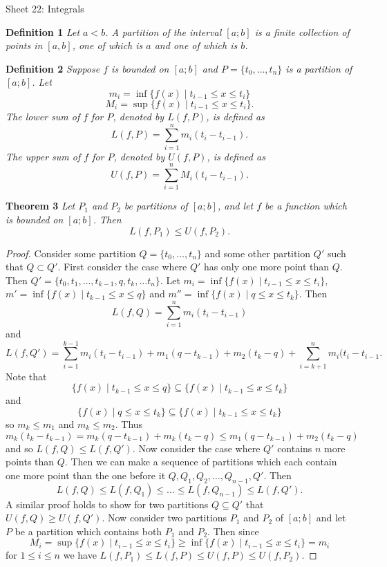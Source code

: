 \documentclass{article}
\begin{document}
\begin{flushleft}

\Large

Sheet 22: Integrals\newline

\normalsize

\textbf{Definition 1}
\textsl{Let $a<b$. A partition of the interval $[a;b]$ is a finite collection of points in $[a,b]$, one of which is $a$ and one of which is $b$.}\newline

\textbf{Definition 2}
\textsl{Suppose $f$ is bounded on $[a;b]$ and $P=\{t_0, \dots , t_n\}$ is a partition of $[a;b]$. Let
\[
m_i = \inf \{f(x) \mid t_{i-1} \leq x \leq t_i\}
\]
\[
M_i = \sup \{f(x) \mid t_{i-1} \leq x \leq t_i\}.
\]
The lower sum of $f$ for $P$, denoted by $L(f,P)$, is defined as
\[
L(f,P) = \sum_{i=1}^n m_i (t_i - t_{i-1}).
\]
The upper sum of $f$ for $P$, denoted by $U(f,P)$, is defined as
\[
U(f,P) = \sum_{i=1}^n M_i (t_i - t_{i-1}).
\]}\newline

\textbf{Theorem 3}
\textsl{Let $P_1$ and $P_2$ be partitions of $[a;b]$, and let $f$ be a function which is bounded on $[a;b]$. Then
\[
L(f,P_1) \leq U(f,P_2).
\]}
\begin{proof}
Consider some partition $Q = \{t_0, \dots , t_n\}$ and some other partition $Q'$ such that $Q \subset Q'$. First consider the case where $Q'$ has only one more point than $Q$. Then $Q' = \{t_0, t_1, \dots , t_{k-1}, q, t_k, \dots t_n\}$. Let $m_i = \inf \{f(x) \mid t_{i-1} \leq x \leq t_i\}$, $m' = \inf \{f(x) \mid t_{k-1} \leq x \leq q\}$ and $m'' = \inf \{f(x) \mid q \leq x \leq t_k\}$. Then
\[
L(f,Q) = \sum_{i=1}^n m_i (t_i - t_{i-1})
\]
and
\[
L(f,Q') = \sum_{i=1}^{k-1} m_i (t_i-t_{i-1}) + m_1 (q-t_{k-1}) + m_2 (t_k-q) + \sum_{i=k+1}^n m_i (t_i-t_{i-1}.
\]
Note that
\[
\{f(x) \mid t_{k-1} \leq x \leq q\} \subseteq \{f(x) \mid t_{k-1} \leq x \leq t_k\}
\]
and
\[
\{f(x) \mid q \leq x \leq t_k\} \subseteq \{f(x) \mid t_{k-1} \leq x \leq t_k\}
\]
so $m_k \leq m_1$ and $m_k \leq m_2$. Thus
\[
m_k (t_k - t_{k-1}) = m_k (q - t_{k-1}) + m_k (t_k - q) \leq m_1 (q - t_{k-1}) + m_2 (t_k - q)
\]
and so $L(f,Q) \leq L(f,Q')$. Now consider the case where $Q'$ contains $n$ more points than $Q$. Then we can make a sequence of partitions which each contain one more point than the one before it $Q, Q_1, Q_2, \dots , Q_{n-1}, Q'$. Then
\[
L(f,Q) \leq L(f,Q_1) \leq \dots \leq L(f,Q_{n-1}) \leq L(f,Q').
\]
A similar proof holds to show for two partitions $Q \subseteq Q'$ that $U(f,Q) \geq U(f,Q')$. Now consider two partitions $P_1$ and $P_2$ of $[a;b]$ and let $P$ be a partition which contains both $P_1$ and $P_2$. Then since
\[
M_i = \sup \{f(x) \mid t_{i-1} \leq x \leq t_i\} \geq \inf \{f(x) \mid t_{i-1} \leq x \leq t_i\} = m_i
\]
for $1 \leq i \leq n$ we have $L(f,P_1) \leq L(f,P) \leq U(f,P) \leq U(f,P_2)$.
\end{proof}


\end{flushleft}
\end{document}
